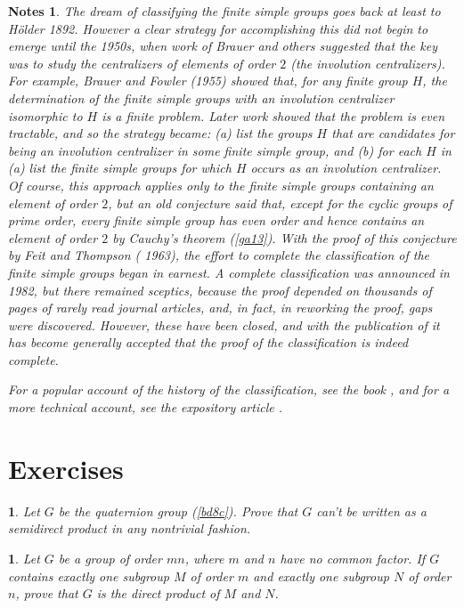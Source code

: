 \documentclass[a4paper,11pt,final]{memoir}%
\newtheorem*{nt}{Notes}
\newtheorem{exercise}[Y]{}
\theoremstyle{nonumberplain}
\begin{document}
\begin{nt}
The dream of classifying the finite simple groups goes back at least to
H\"{o}lder 1892. However a clear strategy for accomplishing this did not begin
to emerge until the 1950s, when work of Brauer and others suggested that the
key was to study the centralizers of elements of order $2$ (the involution
centralizers). For example, Brauer and Fowler (1955)\nocite{brauer1955} showed
that, for any finite group $H$, the determination of the finite simple groups
with an involution centralizer isomorphic to $H$ is a finite problem. Later
work showed that the problem is even tractable, and so the strategy became:
(a) list the groups $H$ that are candidates for being an involution
centralizer in some finite simple group, and (b) for each $H$ in (a) list the
finite simple groups for which $H$ occurs as an involution centralizer.
\noindent Of course, this approach applies only to the finite simple groups
containing an element of order $2$, but an old conjecture said that, except
for the cyclic groups of prime order, every finite simple group has even order
and hence contains an element of order $2$ by Cauchy's theorem (\ref{ga13}).
With the proof of this conjecture by Feit and Thompson (\nocite{feit1963}%
1963), the effort to complete the classification of the finite simple groups
began in earnest. A complete classification was announced in 1982, but there
remained sceptics, because the proof depended on thousands of pages of rarely
read journal articles, and, in fact, in reworking the proof, gaps were
discovered. However, these have been closed, and with the publication of
\cite{aschbacher2004} it has become generally accepted that the proof of the
classification is indeed complete.

\label{solomon}For a popular account of the history of the classification, see
the book \cite{ronan2006}, and for a more technical account, see the
expository article \cite{solomon2001}.
\end{nt}

\section{Exercises}

\begin{exercise}
\label{x14} Let $G$ be the quaternion group (\ref{bd8c}). Prove that $G$ can't
be written as a semidirect product in any nontrivial fashion.
\end{exercise}

\begin{exercise}
\label{x15} Let $G$ be a group of order $mn$, where $m$ and $n$ have no common
factor. If $G$ contains exactly one subgroup $M$ of order $m$ and exactly one
subgroup $N$ of order $n$, prove that $G$ is the direct product of $M$ and $N$.
\end{exercise}
\end{document}
